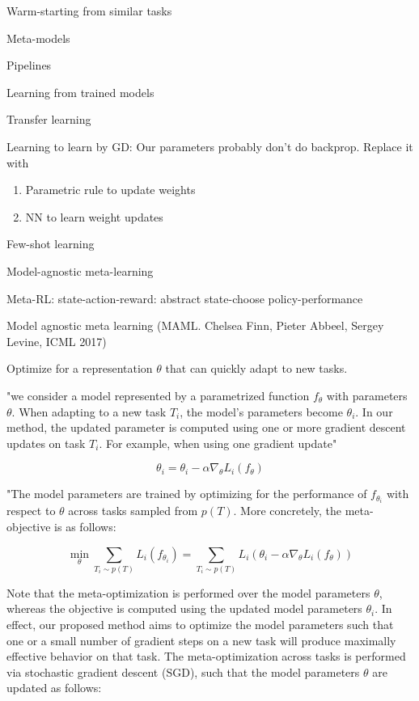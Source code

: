 \documentclass[english]{article}
\begin{document}
Warm-starting from similar tasks

Meta-models

Pipelines

\item Learning from trained models 

Transfer learning

Learning to learn by GD: Our parameters probably don't do backprop. Replace it with 
\begin{enumerate}
\item Parametric rule to update weights
\item NN to learn weight updates
\end{enumerate}

Few-shot learning

Model-agnostic meta-learning

Meta-RL: state-action-reward: abstract state-choose policy-performance

\eenum 

\item Model agnostic meta learning (MAML. Chelsea Finn, Pieter Abbeel, Sergey Levine, ICML 2017)

Optimize for a representation $\theta$ that can
quickly adapt to new tasks.

"we consider a model represented by a parametrized function $f_\theta$ with parameters $\theta$. When adapting to a new task $T_i$, the model's parameters become $\theta_i$. In our method, the updated parameter is computed using one or more gradient descent updates on task $T_i$. For
example, when using one gradient update"

$$\theta_i = \theta_i - \alpha \nabla_\theta L_i(f_\theta)$$

"The model parameters are trained by optimizing for the performance of $f_{\theta_i}$  with respect to $\theta$ across tasks sampled from $p(T)$. More concretely, the meta-objective is as follows:

$$\min_\theta 
\sum_{T_i \sim p(T)} L_i(f_{\theta_i}) 
= 
\sum_{T_i \sim p(T)} L_i(\theta_i - \alpha \nabla_\theta L_i(f_\theta)) 
$$


Note that the meta-optimization is performed over the
model parameters $\theta$, whereas the objective is computed using the updated model parameters $\theta_i$. In effect, our proposed method aims to optimize the model parameters such
that one or a small number of gradient steps on a new task
will produce maximally effective behavior on that task.
The meta-optimization across tasks is performed via
stochastic gradient descent (SGD), such that the model parameters $\theta$ are updated as follows:
\end{document}
